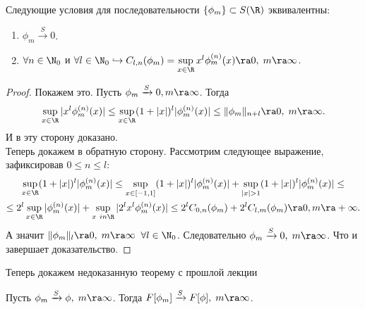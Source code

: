 \begin{note}
    Следующие условия для последовательности $\{\phi_m\} \subset S(\R)$ эквивалентны:
    \begin{enumerate}
        \item $\phi_m \xrightarrow{S} 0$.
        \item $\forall n \in \N_0$ и $\forall l \in \N_0 \hookrightarrow C_{l, n}(\phi_m) = \sup\limits_{x \in \R} x^l \phi^{(n)}_m(x) \ra 0, \; m \ra \infty$.
    \end{enumerate}
\end{note}
\begin{proof}
    Покажем это.
    Пусть $\phi_m \xrightarrow{S} 0, m \ra \infty$.
    Тогда
    \[
        \sup\limits_{x \in \R} |x^l\phi^{(n)}_m(x)| \leq \sup\limits_{x \in \R}(1 + |x|)^l|\phi^{(n)}_m(x)| \leq \|\phi_m\|_{n + l} \ra 0, \; m \ra \infty.
    \]
    И в эту сторону доказано. \\
    Теперь докажем в обратную сторону. Рассмотрим следующее выражение, зафиксировав $0 \leq n \leq l$:
    \begin{multline*}
        \sup\limits_{x \in \R} (1 + |x|)^l|\phi_m^{(n)}(x)| \leq \sup\limits_{x \in [-1, 1]} (1 + |x|)^l|\phi_m^{(n)}(x)| + \sup\limits_{|x| > 1} (1 + |x|)^l|\phi_m^{(n)}(x)| \leq \\ \leq
        2^l \sup\limits_{x \in \R}|\phi_m^{(n)}(x)| + \sup\limits_{x \ in \R}|2^l x^l \phi_m^{(n)}(x)| \leq 2^l C_{0, n}(\phi_m) + 2^l C_{l, m}(\phi_m) \ra 0, m \ra +\infty.
    \end{multline*}
    А значит $\|\phi_m\|_l \ra 0, \; m \ra \infty \;\; \forall l\in \N_0$. Следовательно $\phi_m \xrightarrow{S} 0, \; m \ra \infty$. Что и завершает доказательство.
\end{proof}
\begin{reminder}
    Теперь докажем недоказанную теорему с прошлой лекции
\end{reminder}
\begin{theorem}[Теорема X]
    Пусть $\phi_m \xrightarrow{S} \phi, \; m \ra \infty$.
    Тогда $F[\phi_m] \xrightarrow{S} F[\phi], \; m \ra \infty$.
\end{theorem}
